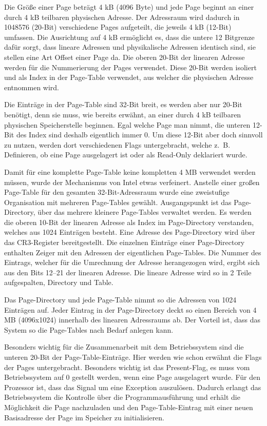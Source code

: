 \documentclass[12pt]{book}
\begin{document}
Die Größe einer Page beträgt 4 kB (4096 Byte) und jede Page beginnt an einer
durch 4 kB teilbaren physischen Adresse. Der Adressraum wird dadurch in 1048576
(20-Bit) verschiedene Pages aufgeteilt, die jeweils 4 kB (12-Bit) umfassen. Die
Ausrichtung auf 4 kB ermöglicht es, dass die untere 12 Bitgrenze dafür sorgt,
dass lineare Adressen und physikalische Adressen identisch sind, sie stellen
eine Art Offset einer Page da. Die oberen 20-Bit der linearen Adresse werden
für die Nummerierung der Pages verwendet. Diese 20-Bit werden isoliert und als
Index in der Page-Table verwendet, aus welcher die physischen Adresse entnommen
wird.

Die Einträge in der Page-Table sind 32-Bit breit, es werden aber nur 20-Bit
benötigt, denn sie muss, wie bereits erwähnt, an einer durch 4 kB teilbaren
physischen Speicherstelle beginnen. Egal welche Page man nimmt, die unteren
12-Bit des Index sind deshalb eigentlich immer 0. Um diese 12-Bit aber doch
sinnvoll zu nutzen, werden dort verschiedenen Flags untergebracht, welche z. B.
Definieren, ob eine Page ausgelagert ist oder als Read-Only deklariert wurde.

Damit für eine komplette Page-Table keine kompletten 4 MB verwendet werden
müssen, wurde der Mechanismus von Intel etwas verfeinert.  Anstelle einer
großen Page-Table für den gesamten 32-Bit-Adressraum wurde eine zweistufige
Organisation mit mehreren Page-Tables gewählt. Ausgangspunkt ist das
Page-Directory, über das mehrere kleinere Page-Tables verwaltet werden. Es
werden die oberen 10-Bit der linearen Adresse als Index im Page-Directory
verstanden, welches aus 1024 Einträgen besteht. Eine Adresse des Page-Directory
wird über das CR3-Register bereitgestellt. Die einzelnen Einträge einer
Page-Directory enthalten Zeiger mit den Adressen der eigentlichen Page-Tables.
Die Nummer des Eintrags, welcher für die Umrechnung der Adresse herangezogen
wird, ergibt sich aus den Bits 12–21 der linearen Adresse. Die lineare Adresse
wird so in 2 Teile aufgespalten, Directory und Table.

Das Page-Directory und jede Page-Table nimmt so die Adressen von 1024 Einträgen
auf. Jeder Eintrag in der Page-Directory deckt so einen Bereich von 4 MB
(4096x1024) innerhalb des linearen Adressraums ab. Der Vorteil ist, dass das
System so die Page-Tables nach Bedarf anlegen kann.

Besonders wichtig für die Zusammenarbeit mit dem Betriebssystem sind die
unteren 20-Bit der Page-Table-Einträge. Hier werden wie schon erwähnt die Flags
der Pages untergebracht. Besonders wichtig ist das Present-Flag, es muss vom
Betriebssystem auf 0 gestellt werden, wenn eine Page ausgelagert wurde. Für den
Prozessor ist, dass das Signal um eine Exception auszulösen. Dadurch erlangt
das Betriebssystem die Kontrolle über die Programmausführung und erhält die
Möglichkeit die Page nachzuladen und den Page-Table-Eintrag mit einer neuen
Basisadresse der Page im Speicher zu initialisieren.
\end{document}
